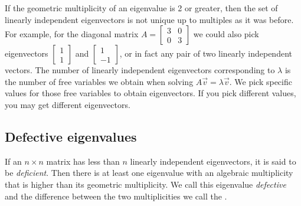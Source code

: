 If the geometric multiplicity of an eigenvalue is 2 or greater,
then the set of linearly independent eigenvectors is not unique up to
multiples as it was before.  For example, for the diagonal matrix $A =
\left[ \begin{smallmatrix} 3 & 0 \\ 0 & 3 \end{smallmatrix} \right]$
we could also pick eigenvectors
$\left[ \begin{smallmatrix} 1 \\ 1 \end{smallmatrix} \right]$
and
$\left[ \begin{smallmatrix} 1 \\ -1 \end{smallmatrix} \right]$, or in fact
any pair of two linearly independent vectors.  The number of linearly
independent eigenvectors corresponding to $\lambda$
is the number of free variables we obtain when solving $A\vec{v} =
\lambda \vec{v}$.  We pick specific values for those free variables to
obtain eigenvectors.  If you pick different values, you may get different
eigenvectors.


\subsection{Defective eigenvalues}

If an $n \times n$ matrix has less than $n$ linearly independent
eigenvectors, it is said to be \emph{deficient}.
Then there is at least
one eigenvalue with an algebraic multiplicity that is higher than its geometric
multiplicity.  We call this eigenvalue \emph{defective}
and the difference
between the two multiplicities we call the \emph{}.

